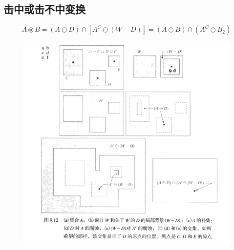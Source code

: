 \subsection{击中或击不中变换}
\begin{definition}
\[A\circledast B=(A\ominus D)\cap[A^C\ominus(W-D)]=(A\ominus B)\cap(A^C\ominus B_2)\]
\end{definition}
\begin{figure}[H]
\centering
\includegraphics[width=0.9\linewidth]{fig/hit-or-miss.png}
\end{figure}


